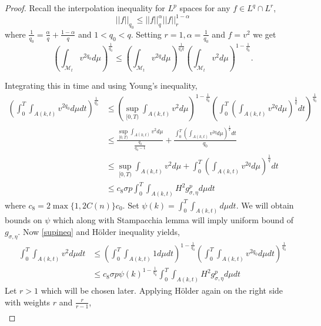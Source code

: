 \begin{proof}
        Recall the interpolation inequality for $ L^{p} $ spaces for any $ f \in L^{q} \cap L^{r} $,
        \[ ||f||_{q_{0}} \le ||f||_{q}^{\alpha}||f||_{r}^{1-\alpha} \]
        where $ \frac{1}{q_{0}} = \frac{\alpha}{q}+ \frac{1-\alpha}{q} $ and $ 1<q_{0}<q $. Setting $ r=1, \alpha = \frac{1}{q_{0}}$ and $ f=v^{2} $ we get \begin{equation}
            \left( \int_{\mathcal{M}_{t}}v^{2q_{0}} d \mu \right)^{\frac{1}{q_{0}}} \le \left( \int_{\mathcal{M}_{t}}v^{2q}d \mu \right)^{\frac{1}{q_{0}q}} \left( \int_{\mathcal{M}_{t}}v^{2}d \mu \right)^{1-\frac{1}{q_{0}}}.
        \end{equation}

        Integrating this in time and using Young's inequality, \begin{align*}
            \left( \int_{0}^{T}\int_{A(k,t)}v^{2q_{0}}d \mu dt \right)^{\frac{1}{q_{0}}} &\le \left( \sup_{[0,T)}\int_{A(k,t)}v^{2}d \mu  \right)^{1-\frac{1}{q_{0}}}\left( \int_{0}^{T}\left( \int_{A(k,t)}v^{2q}d \mu \right)^{\frac{1}{q}} dt\right)^{\frac{1}{q_{0}}} \\
            & \le \frac{ \sup_{[0,T)}\int_{A(k,t)}v^{2}d \mu}{\frac{q_{0}}{q_{0}-1}}+ \frac{\int_{0}^{T}\left( \int_{A(k,t)}v^{2q}d \mu \right)^{\frac{1}{q}} dt}{q_{0}} \\
            & \le  \sup_{[0,T)}\int_{A(k,t)}v^{2}d \mu+ \int_{0}^{T}\left( \int_{A(k,t)}v^{2q}d \mu \right)^{\frac{1}{q}} dt \\
            & \le c_{8} \sigma p \int_{0}^{T}\int_{A(k,t)}H^{2}g_{\sigma,\eta}^{p}d \mu dt
        \end{align*}
        where $ c_{8} =  2\max\{1,2C(n)\}c_{0}$. Set $ \psi(k) = \int_{0}^{T} \int_{A(k,t)}d \mu dt $. We will obtain bounds on $ \psi $ which along with Stampacchia lemma will imply uniform bound of $ g_{\sigma,\eta} $.  Now \cref{supineq} and H\"{o}lder inequality yields, \begin{align}
            \int_{0}^{T}\int_{A(k,t)}v^{2}d \mu dt & \le \left( \int_{0}^{T}\int_{A(k,t)}1 d \mu dt\right)^{1-\frac{1}{q_{0}}} \left( \int_{0}^{T}\int_{A(k,t)}v^{2q_{0}}d \mu dt \right)^{\frac{1}{q_{0}}} \\
            & \le c_{8} \sigma p\psi(k)^{1-\frac{1}{q_{0}}} \int_{0}^{T}\int_{A(k,t)}H^{2}g_{\sigma,\eta}^{p}d \mu dt \label{v2bound}
        \end{align}
        Let $ r>1 $ which will be chosen later. Applying H\"{o}lder again on the right side with weights $ r $ and $ \frac{r}{r-1} $, \begin{align*}

\end{align*}
\end{proof}
